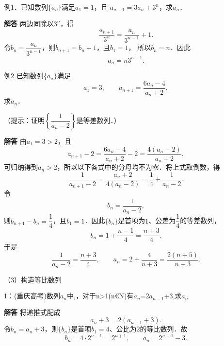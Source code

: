 例1．已知数列$\{a_n\}$满足$a_1=1$，且
$a_{n+1}=3a_n+3^n$，求$a_n$．\par
\QuestionSpace{2.5cm}
\ifshowanswers
\par\begingroup\color{solutioncolor}\noindent\textbf{解答}\quad
两边同除以$3^n$，得
\[
\frac{a_{n+1}}{3^n}=\frac{a_n}{3^{n-1}}+1.
\]
令$b_n=\dfrac{a_n}{3^{n-1}}$，则$b_{n+1}=b_n+1$，且$b_1=1$，
所以$b_n=n$．因此
\[
\boxed{a_n=n3^{n-1}}.
\]
\par\endgroup\fi
{}
例2 已知数列$\{a_n\}$满足
\[
a_1=3,\qquad a_{n+1}=\frac{6a_n-4}{a_n+2},
\]
求$a_n$．\par
（提示：证明$\left\{\dfrac1{a_n-2}\right\}$是等差数列．）\par
\QuestionSpace{3.5cm}
\ifshowanswers
\par\begingroup\color{solutioncolor}\noindent\textbf{解答}\quad
由$a_1=3>2$，且
\[
a_{n+1}-2
=\frac{6a_n-4}{a_n+2}-2
=\frac{4(a_n-2)}{a_n+2},
\]
可归纳得到$a_n>2$，所以以下各式中的分母均不为零．将上式取倒数，得
\[
\frac1{a_{n+1}-2}
=\frac{a_n+2}{4(a_n-2)}
=\frac14+\frac1{a_n-2}.
\]
令
\[
b_n=\frac1{a_n-2},
\]
则$b_{n+1}-b_n=\dfrac14$，且$b_1=1$．因此$\{b_n\}$是首项为$1$、公差为$\dfrac14$的等差数列，
\[
b_n=1+\frac{n-1}{4}=\frac{n+3}{4}.
\]
于是
\[
\frac1{a_n-2}=\frac{n+3}{4},
\qquad
\boxed{a_n=2+\frac4{n+3}=\frac{2(n+5)}{n+3}}.
\]
\par\endgroup\fi
（3）构造等比数列\par
1：(重庆高考)数列{\ensuremath{a_{n}}}中,，对于n>1(n€N)有\ensuremath{a_{n}}=2\ensuremath{a_{n-1}}+3,求\ensuremath{a_{n}}\par
\QuestionSpace{3.5cm}
\ifshowanswers
\par\begingroup\color{solutioncolor}\noindent\textbf{解答}\quad
将递推式配成
\[
a_n+3=2(a_{n-1}+3).
\]
令$b_n=a_n+3$，则$\{b_n\}$是首项$b_1=4$、公比为$2$的等比数列．故
\[
b_n=4\cdot2^{n-1}=2^{n+1},
\qquad
\boxed{a_n=2^{n+1}-3}.
\]
\par\endgroup\fi


